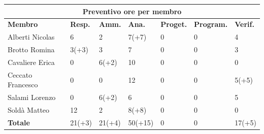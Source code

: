\documentclass[a4paper, 12pt]{article}
\begin{document}
\begin{center}
	\begin{tabularx}{\textwidth}{|X|X|X|X|X|X|X|}
		\hline
		\multicolumn{7}{|c|}{\textbf{Preventivo ore per membro}}                                 \\
		\hline
		\hline
		\textbf{Membro}   & \textbf{Resp.}    & \textbf{Amm.}   & \textbf{Ana.} &
		\textbf{Proget.}  & \textbf{Program.} & \textbf{Verif.}                                  \\
		\hline
		Alberti Nicolas   & 6                 & 2               & 7(+7)         & 0 & 0 & 4      \\
		\hline
		Brotto Romina     & 3(+3)             & 3               & 7             & 0 & 0 & 3      \\
		\hline
		Cavaliere Erica   & 0                 & 6(+2)           & 10            & 0 & 0 & 0      \\
		\hline
		Ceccato Francesco & 0                 & 0               & 12            & 0 & 0 & 5(+5)  \\
		\hline
		Salami Lorenzo    & 0                 & 6(+2)           & 6             & 0 & 0 & 5      \\
		\hline
		Soldà Matteo      & 12                & 2               & 8(+8)         & 0 & 0 & 0      \\
		\hline
		\hline
		\textbf{Totale}   & 21(+3)            & 21(+4)          & 50(+15)       & 0 & 0 & 17(+5) \\
		\hline
	\end{tabularx}\\[8pt]
	\mbox{}\\
\end{center}

\newpage
\end{document}
